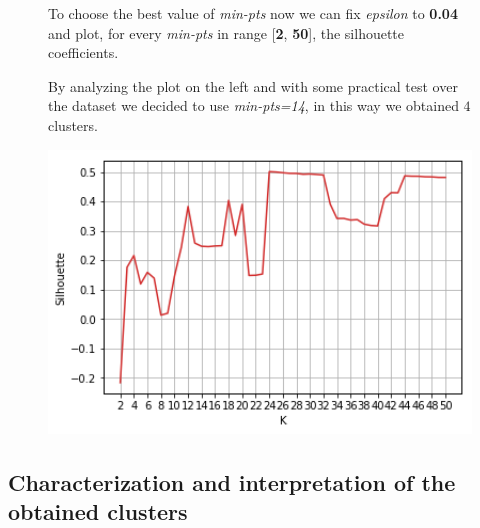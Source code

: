 \begin{figure}[h]

  \begin{minipage}[h]{.40\textwidth}
To choose the best value of \textit{min-pts} now we can fix \textit{epsilon} to \textbf{0.04} and plot, for every \textit{min-pts} in range [\textbf{2}, \textbf{50}], the silhouette coefficients.

  \smallskip

  By analyzing the plot on the left and with some practical test over the dataset we decided to use \textit{min-pts=14}, in this way we obtained $4$ clusters.
  \end{minipage}
  \begin{minipage}[h]{.60\textwidth}    
    \includegraphics[width=1\textwidth]{img/ch3/dbscan_silhouette}
  \end{minipage}
  
\end{figure}

\clearpage

\subsection{Characterization and interpretation of the obtained clusters}

